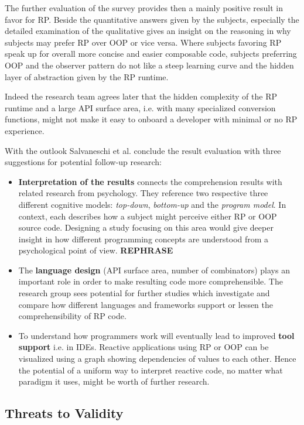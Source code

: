\documentclass[12pt,a4paper]{article}
\begin{document}
The further evaluation of the survey provides then a mainly positive result in favor for RP. Beside the quantitative answers given by the subjects, especially the detailed examination of the qualitative gives an insight on the reasoning in why subjects may prefer RP over OOP or vice versa. Where subjects favoring RP speak up for overall more concise and easier composable code, subjects preferring OOP and the observer pattern do not like a steep learning curve and the hidden layer of abstraction given by the RP runtime.

Indeed the research team agrees later that the hidden complexity of the RP runtime and a large API surface area, i.e. with many specialized conversion functions, might not make it easy to onboard a developer with minimal or no RP experience.

With the outlook Salvaneschi et al. conclude the result evaluation with three suggestions for potential follow-up research:

\begin{itemize}
	\item \textbf{Interpretation of the results} connects the comprehension results with related research from psychology. They reference two respective three different cognitive models: \emph{top-down}, \emph{bottom-up} and the \emph{program model}. In context, each describes how a subject might perceive either RP or OOP source code. Designing a study focusing on this area would give deeper insight in how different programming concepts are understood from a psychological point of view. \textbf{REPHRASE}
	\item The \textbf{language design} (API surface area, number of combinators) plays an important role in order to make resulting code more comprehensible. The research group sees potential for further studies which investigate and compare how different languages and frameworks support or lessen the comprehensibility of RP code.
	\item To understand how programmers work will eventually lead to improved \textbf{tool support} i.e. in IDEs. Reactive applications using RP or OOP can be visualized using a graph showing dependencies of values to each other. Hence the potential of a uniform way to interpret reactive code, no matter what paradigm it uses, might be worth of further research.
\end{itemize}

\subsection{Threats to Validity}
\end{document}
